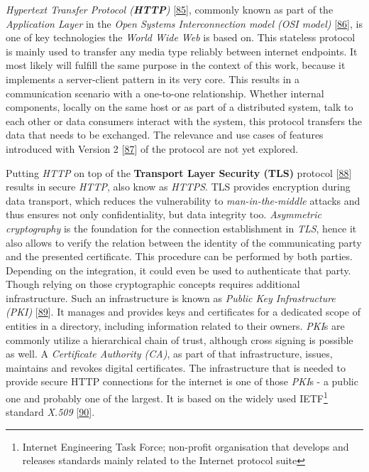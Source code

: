 \documentclass[12pt,english,a4paper,titlepage,cleardoublepage=empty,dottedtoc]{report}
\begin{document}
\emph{Hypertext Transfer Protocol
(\textbf{\protect\hypertarget{def--http}{}{HTTP}})}
{[}\protect\hyperlink{ref-web_spec_http1}{85}{]}, commonly known as part
of the \emph{Application Layer} in the \emph{Open Systems
Interconnection model (OSI model)}
{[}\protect\hyperlink{ref-web_2017_wikipedia_osi-model}{86}{]}, is one
of key technologies the \emph{World Wide Web} is based on. This
stateless protocol is mainly used to transfer any media type reliably
between internet endpoints. It most likely will fulfill the same purpose
in the context of this work, because it implements a server-client
pattern in its very core. This results in a communication scenario with
a one-to-one relationship. Whether internal components, locally on the
same host or as part of a distributed system, talk to each other or data
consumers interact with the system, this protocol transfers the data
that needs to be exchanged. The relevance and use cases of features
introduced with Version 2
{[}\protect\hyperlink{ref-web_spec_http2}{87}{]} of the protocol are not
yet explored.

Putting \emph{HTTP} on top of the \textbf{Transport Layer Security
(TLS)} protocol {[}\protect\hyperlink{ref-web_spec_tls}{88}{]} results
in secure \emph{HTTP}, also know as
\emph{\protect\hypertarget{def--https}{}{HTTPS}}. TLS provides
encryption during data transport, which reduces the vulnerability to
\emph{man-in-the-middle} attacks and thus ensures not only
confidentiality, but data integrity too. \emph{Asymmetric cryptography}
is the foundation for the connection establishment in \emph{TLS}, hence
it also allows to verify the relation between the identity of the
communicating party and the presented certificate. This procedure can be
performed by both parties. Depending on the integration, it could even
be used to authenticate that party. Though relying on those
cryptographic concepts requires additional infrastructure. Such an
infrastructure is known as \emph{Public Key Infrastructure (PKI)}
{[}\protect\hyperlink{ref-book_2014_chapter-14-5-pki}{89}{]}. It manages
and provides keys and certificates for a dedicated scope of entities in
a directory, including information related to their owners. \emph{PKI}s
are commonly utilize a hierarchical chain of trust, although cross
signing is possible as well. A \emph{Certificate Authority (CA)}, as
part of that infrastructure, issues, maintains and revokes digital
certificates. The infrastructure that is needed to provide secure HTTP
connections for the internet is one of those \emph{PKI}s - a public one
and probably one of the largest. It is based on the widely used
IETF\footnote{Internet Engineering Task Force; non-profit organisation
  that develops and releases standards mainly related to the Internet
  protocol suite} standard \emph{X.509}
{[}\protect\hyperlink{ref-web_spec_x509}{90}{]}.
\end{document}
